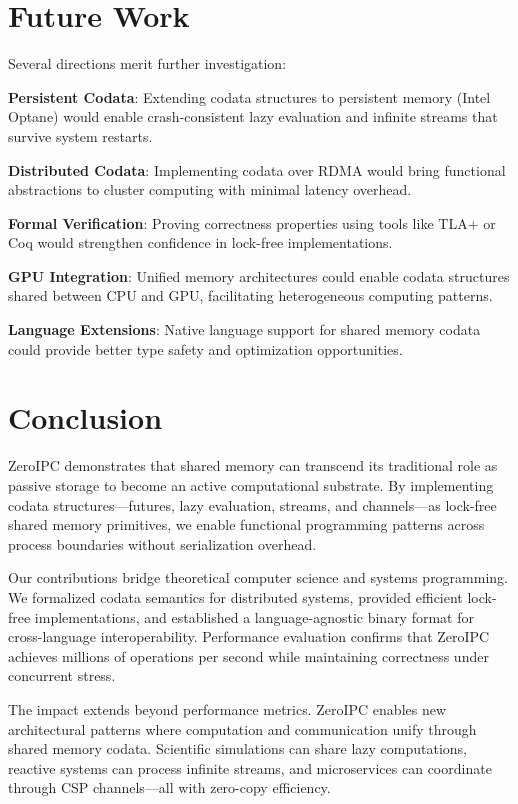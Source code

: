 \documentclass[10pt,conference]{IEEEtran}
\begin{document}
\section{Future Work}

Several directions merit further investigation:

\textbf{Persistent Codata}: Extending codata structures to persistent memory (Intel Optane) would enable crash-consistent lazy evaluation and infinite streams that survive system restarts.

\textbf{Distributed Codata}: Implementing codata over RDMA would bring functional abstractions to cluster computing with minimal latency overhead.

\textbf{Formal Verification}: Proving correctness properties using tools like TLA+ or Coq would strengthen confidence in lock-free implementations.

\textbf{GPU Integration}: Unified memory architectures could enable codata structures shared between CPU and GPU, facilitating heterogeneous computing patterns.

\textbf{Language Extensions}: Native language support for shared memory codata could provide better type safety and optimization opportunities.

\section{Conclusion}

ZeroIPC demonstrates that shared memory can transcend its traditional role as passive storage to become an active computational substrate. By implementing codata structures---futures, lazy evaluation, streams, and channels---as lock-free shared memory primitives, we enable functional programming patterns across process boundaries without serialization overhead.

Our contributions bridge theoretical computer science and systems programming. We formalized codata semantics for distributed systems, provided efficient lock-free implementations, and established a language-agnostic binary format for cross-language interoperability. Performance evaluation confirms that ZeroIPC achieves millions of operations per second while maintaining correctness under concurrent stress.

The impact extends beyond performance metrics. ZeroIPC enables new architectural patterns where computation and communication unify through shared memory codata. Scientific simulations can share lazy computations, reactive systems can process infinite streams, and microservices can coordinate through CSP channels---all with zero-copy efficiency.
\end{document}
